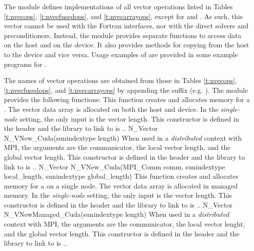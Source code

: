 The {\nveccuda} module defines implementations of all vector operations listed
in Tables \ref{t:nvecops}, \ref{t:nvecfusedops}, and \ref{t:nvecarrayops}, except
for  and .
As such, this vector cannot be used with the {\sundials} Fortran interfaces,
nor with the {\sundials} direct solvers and preconditioners. Instead,
the {\nveccuda} module provides separate functions to access data on the host
and on the device. It also provides methods for copying from the host to
the device and vice versa. Usage examples of {\nveccuda} are provided in
some example programs for {\cvode} \cite{cvode_ex}.

The names of vector operations are obtained from those in Tables \ref{t:nvecops},
\ref{t:nvecfusedops}, and \ref{t:nvecarrayops} by appending the suffix 
(e.g. ). The module {\nveccuda} provides the following
functions:
{
  This function creates and allocates memory for a {\cuda} .
  The vector data array is allocated on both the host and device.
}
{
  In the \textit{single-node} setting, the only input is the vector length. This
  constructor is defined in the header  and the library to
  link to is ..
}
{
  N\_Vector N\_VNew\_Cuda(sunindextype length)
}
{
  When used in a \textit{distributed} context with MPI, the arguments are the
  {\mpi} communicator, the local vector length, and the global vector length.
  This constructor is defined in the header  and
  the library to link to is ..
}
{
  N\_Vector N\_VNew\_Cuda(MPI\_Comm comm, sunindextype local\_length,
  sunindextype global\_length)
}
{
  This function creates and allocates memory for a {\cuda} 
  on a single node. The vector data array is allocated in managed memory.
}
{
  In the \textit{single-node} setting, the only input is the vector length. This
  constructor is defined in the header  and the library to
  link to is ..
}
{
  N\_Vector N\_VNewManaged\_Cuda(sunindextype length)
}
{
  When used in a \textit{distributed} context with MPI, the arguments are the
  {\mpi} communicator, the local vector lenght, and the global vector length.
  This constructor is defined in the header  and
  the library to link to is ..
}
